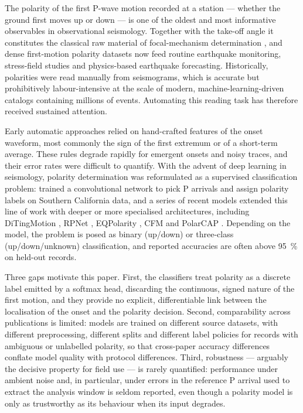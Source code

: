 \documentclass[11pt]{article}
\begin{document}
The polarity of the first P-wave motion recorded at a station --- whether the
ground first moves up or down --- is one of the oldest and most informative
observables in observational seismology. Together with the take-off angle it
constitutes the classical raw material of focal-mechanism determination
\citep{hardebeck2002hash}, and dense first-motion polarity datasets now feed
routine earthquake monitoring, stress-field studies and physics-based
earthquake forecasting. Historically, polarities were read manually from
seismograms, which is accurate but prohibitively labour-intensive at the scale
of modern, machine-learning-driven catalogs containing millions of events.
Automating this reading task has therefore received sustained attention.

Early automatic approaches relied on hand-crafted features of the onset
waveform, most commonly the sign of the first extremum or of a short-term
average. These rules degrade rapidly for emergent onsets and noisy traces, and
their error rates were difficult to quantify. With the advent of deep learning
in seismology, polarity determination was reformulated as a supervised
classification problem: \citet{ross2018} trained a convolutional network to
pick P arrivals and assign polarity labels on Southern California data, and a
series of recent models extended this line of work with deeper or more
specialised architectures, including DiTingMotion \citep{zhao2023ditingmotion},
RPNet \citep{han2025rpnet}, EQPolarity \citep{chen2024eqpolarity}, CFM
\citep{messuti2023cfm} and PolarCAP \citep{chakraborty2022polarcap}. Depending
on the model, the problem is posed as binary (up/down) or three-class
(up/down/unknown) classification, and reported accuracies are often above
\SI{95}{\percent} on held-out records.

Three gaps motivate this paper. First, the classifiers treat polarity as a
discrete label emitted by a softmax head, discarding the continuous, signed
nature of the first motion, and they provide no explicit, differentiable link
between the localisation of the onset and the polarity decision. Second,
comparability across publications is limited: models are trained on different
source datasets, with different preprocessing, different splits and different
label policies for records with ambiguous or unlabelled polarity, so that
cross-paper accuracy differences conflate model quality with protocol
differences. Third, robustness --- arguably the decisive property for field use
--- is rarely quantified: performance under ambient noise and, in particular,
under errors in the reference P arrival used to extract the analysis window is
seldom reported, even though a polarity model is only as trustworthy as its
behaviour when its input degrades.
\end{document}
